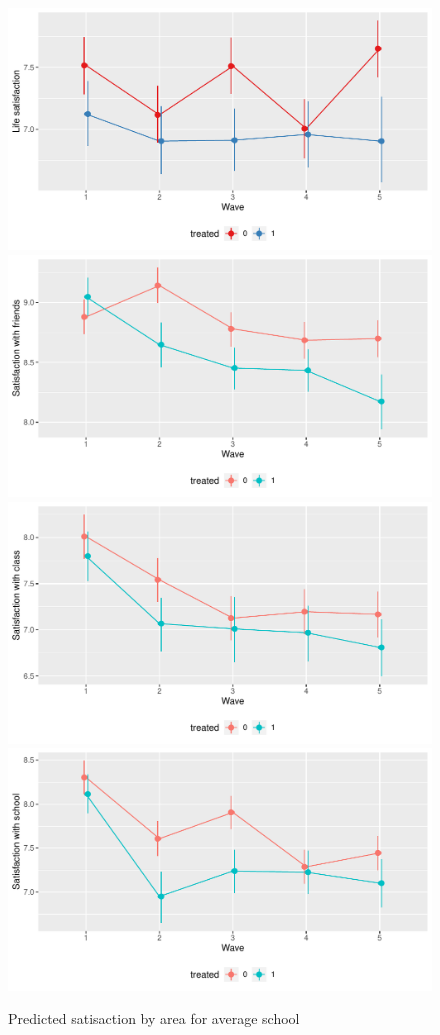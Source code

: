\documentclass[a4, 12pt]{article}
\begin{document}
\begin{figure}
\includegraphics[width=0.5\linewidth]{../figures/lsat_pred} \includegraphics[width=0.5\linewidth]{../figures/sat_friends_pred} \includegraphics[width=0.5\linewidth]{../figures/sat_class_pred} \includegraphics[width=0.5\linewidth]{../figures/sat_school_pred} \caption{Predicted satisaction by area for average school}\label{fig:sat-pred}
\end{figure}
\end{document}
